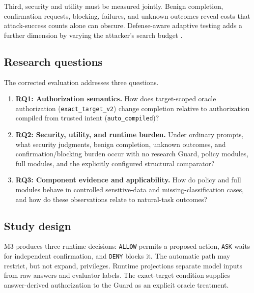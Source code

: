 Third, security and utility must be measured jointly. Benign completion, confirmation requests, blocking, failures, and unknown outcomes reveal costs that attack-success counts alone can obscure. Defense-aware adaptive testing adds a further dimension by varying the attacker's search budget \citep{L27}.

\subsection{Research questions}

\label{sec:introduction-research-questions}

The corrected evaluation addresses three questions.

\begin{enumerate}

\item \textbf{RQ1: Authorization semantics.} How does target-scoped oracle authorization (\nolinkurl{exact_target_v2}) change completion relative to authorization compiled from trusted intent (\nolinkurl{auto_compiled})?

\item \textbf{RQ2: Security, utility, and runtime burden.} Under ordinary prompts, what security judgments, benign completion, unknown outcomes, and confirmation/blocking burden occur with no research Guard, policy modules, full modules, and the explicitly configured structural comparator?

\item \textbf{RQ3: Component evidence and applicability.} How do policy and full modules behave in controlled sensitive-data and missing-classification cases, and how do these observations relate to natural-task outcomes?

\end{enumerate}

\subsection{Study design}

\label{sec:introduction-study-design}

M3 produces three runtime decisions: \nolinkurl{ALLOW} permits a proposed action, \nolinkurl{ASK} waits for independent confirmation, and \nolinkurl{DENY} blocks it. The automatic path may restrict, but not expand, privileges. Runtime projections separate model inputs from raw answers and evaluator labels. The exact-target condition supplies answer-derived authorization to the Guard as an explicit oracle treatment.

